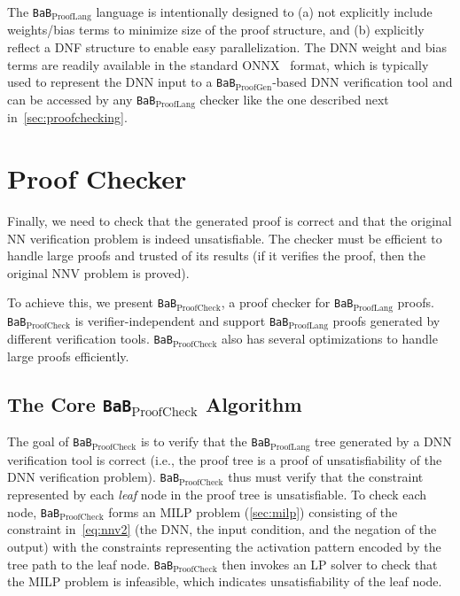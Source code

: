 \documentclass[oneside,11pt,dvipsnames]{book}
\numberwithin{equation}{section}
\theoremstyle{definition}
\theoremstyle{remark}
\newcommand{\proofgen}{\texttt{BaB$_{\text{ProofGen}}$}}
\newcommand{\prooflang}{\texttt{BaB$_{\text{ProofLang}}$}}
\newcommand{\proofcheck}{\texttt{BaB$_{\text{ProofCheck}}$}}
\begin{document}
The \prooflang{} language is intentionally designed to (a) not explicitly include weights/bias terms to minimize size of the proof structure, and (b) explicitly reflect a DNF structure to enable easy parallelization.
The DNN weight and bias terms are readily available in the standard ONNX~\cite{onnx} format, which is typically used to represent the DNN input to a \proofgen{}-based DNN verification tool and can be accessed by any \prooflang{} checker like the one described next in~\autoref{sec:proofchecking}.


\section{Proof Checker}\label{sec:proofchecking}
Finally, we need to check that the generated proof is correct and that the original NN verification problem is indeed unsatisfiable. The checker must be efficient to handle large proofs and trusted of its results (if it verifies the proof, then the original NNV problem is proved).


To achieve this, we present \proofcheck{}, a proof checker for \prooflang{} proofs.
\proofcheck{} is verifier-independent and support \prooflang{} proofs generated by different verification tools. \proofcheck{} also has several optimizations to handle large proofs efficiently.

\subsection{The Core \proofcheck{} Algorithm}


The goal of \proofcheck{} is to verify that the \prooflang{} tree generated by a DNN verification tool is correct (i.e., the proof tree is a proof of unsatisfiability of the DNN verification problem).
\proofcheck{} thus must verify that the constraint represented by each \emph{leaf} node in the proof tree is unsatisfiable. To check each node, \proofcheck{} forms an MILP problem (\autoref{sec:milp}) consisting of the constraint in~\autoref{eq:nnv2} (the DNN, the input condition, and the negation of the output) with the constraints representing the activation pattern encoded by the tree path to the leaf node. \proofcheck{} then invokes an LP solver to check that the MILP problem is infeasible, which indicates unsatisfiability of the leaf node. 
\end{document}
